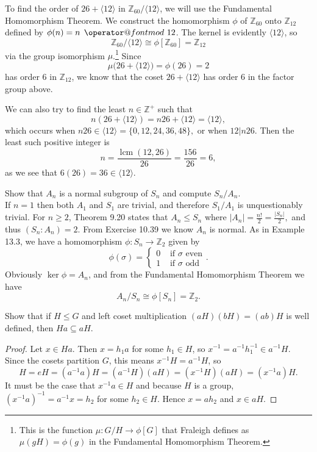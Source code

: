 \documentclass{article}
\makeatletter
\newenvironment{problem1}[1]{\noindent {\bf Problem #1:}}
{\medskip}
\def\imod#1{\allowbreak\mkern8mu{\operator@font mod}\,\,#1}
\DeclareMathOperator{\lcm}{lcm}
\makeatother
\begin{document}
\begin{problem1}{10} To find the order of $26+\langle 12 \rangle$ in $\mathbb{Z}_{60}/\langle12\rangle$, we will use the Fundamental Homomorphism Theorem. We construct the homomorphism $\phi$ of $\mathbb{Z}_{60}$ onto $\mathbb{Z}_{12}$ defined by $\phi(n)=n\imod{12}$. The kernel is evidently $\langle 12\rangle $, so $$\mathbb{Z}_{60}/\langle12\rangle \cong \phi[\mathbb{Z}_{60}]=\mathbb{Z}_{12}$$ via the group isomorphism $\mu$.\footnote{This is the function $\mu:G/H\to \phi[G]$ that Fraleigh defines as $\mu(gH)=\phi(g)$ in the Fundamental Homomorphism Theorem.} Since $$\mu\big(26+\langle 12\rangle)=\phi(26)=2$$ has order 6 in $\mathbb{Z}_{12}$, we know that the coset $26 + \langle 12 \rangle $ has order 6 in the factor group above.

We can also try to find the least $n\in\mathbb{Z}^+$ such that $$n(26+\langle12\rangle)=n26+\langle12\rangle=\langle12\rangle,$$ which occurs when $n26\in\langle12\rangle=\{0,12,24,36,48\},$ or when $12\vert n26.$ Then the least such positive integer is $$n=\frac{\lcm(12,26)}{26}=\frac{156}{26}=6,$$ as we see that $6(26)=36\in\langle 12 \rangle.$
\end{problem1}


\begin{problem1}{24} Show that $A_n$ is a normal subgroup of $S_n$ and compute $S_n/A_n.$\\

If $n=1$ then both $A_1$ and $S_1$ are trivial, and therefore $S_1/A_1$ is unquestionably trivial. For $n\ge2$, Theorem 9.20 states that $A_n\le S_n$ where $|A_n|=\frac{n!}{2}=\frac{|S_n|}{2},$ and thus $(S_n:A_n)=2$. From Exercise 10.39 we know $A_n$ is normal. As in Example 13.3, we have a homomorphism $\phi: S_n\to \mathbb{Z}_2$ given by $$\phi(\sigma)=\begin{cases} 0 &\text{ if $\sigma$ even}\\ 1 &\text{ if $\sigma$ odd } \end{cases}.$$ Obviously $\ker\phi=A_n$, and from the Fundamental Homomorphism Theorem we have $$A_n/S_n\cong \phi[S_n]=\mathbb{Z}_2.$$

\end{problem1}


\begin{problem1}{25} Show that if $H\le G$ and left coset multiplication $(aH)(bH)=(ab)H$ is well defined, then $Ha\subseteq aH$.
\begin{proof} Let $x\in Ha$. Then $x= h_1a$ for some $h_1\in H$, so $x^{-1}=a^{-1}h_1^{-1}\in a^{-1}H$. Since the cosets partition $G$, this means $x^{-1}H=a^{-1}H$, so $$H=eH=(a^{-1}a)H=(a^{-1}H)(aH)=(x^{-1}H)(aH)=(x^{-1}a)H.$$
It must be the case that $x^{-1}a\in H$ and because $H$ is a group, $(x^{-1}a)^{-1}=a^{-1}x=h_2$  for some $h_2\in H$. Hence $x=ah_2$ and $x\in aH$.
\end{proof}
\end{problem1}
\end{document}
